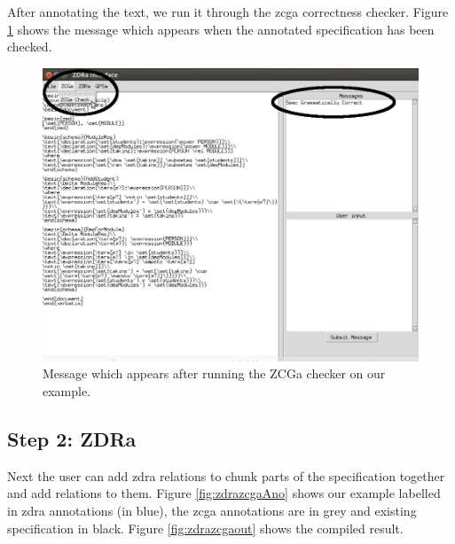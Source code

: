 After annotating the text, we run it through the \gls{zcga} correctness checker. Figure
\ref{fig:zcgacorrect} shows the message which appears when the annotated
specification has been checked. 

\begin{figure}[H]
\centering
\includegraphics[scale=0.4]{Figures/fullexample/zcgacorrect.png}
\caption{Message which appears after running the ZCGa checker on our example. \label{fig:zcgacorrect}}
\end{figure}

\subsection{Step 2: ZDRa}

Next the user can add \gls{zdra} relations to chunk parts of the specification
together and add relations to them. Figure \ref{fig:zdrazcgaAno} shows our
example labelled in \gls{zdra} annotations (in blue), the \gls{zcga} annotations
are in grey and existing specification in black. Figure \ref{fig:zdrazcgaout}
shows the compiled result.

